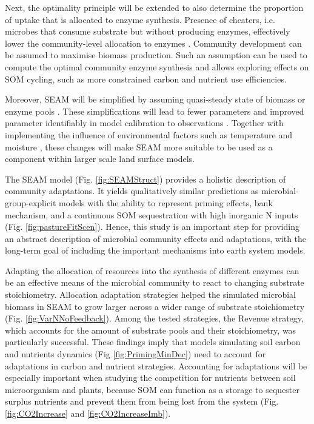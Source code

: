 Next, the optimality principle will be extended to also determine the proportion
of uptake that is allocated to enzyme synthesis. Presence of cheaters, i.e.
microbes that consume substrate but without producing enzymes, effectively lower
the community-level allocation to enzymes \citep{Kaiser14}. Community
development can be assumed to maximise biomass production. Such an assumption
can be used to compute the optimal community enzyme synthesis and allows
exploring effects on SOM cycling, such as more constrained carbon and nutrient
use efficiencies.

Moreover, SEAM will be simplified by assuming quasi-steady state of biomass or
enzyme pools \citep{Wutzler13}. These simplifications will lead to fewer
parameters and improved parameter identifiably in model calibration to
observations \citep{Xu14}.
Together with implementing the influence of environmental factors such as
temperature and moisture \citep{Davidson12}, these changes will make SEAM more
suitable to be used as a component within larger scale land surface models.
 
\conclusions
The SEAM model (Fig. \ref{fig:SEAMStruct}) provides a holistic description of
community adaptations. It yields qualitatively similar predictions as
microbial-group-explicit models with the ability to represent priming effects,
bank mechanism, and a continuous SOM sequestration with high inorganic N inputs
(Fig. \ref{fig:pastureFitScen}). Hence, this study is an important step
for providing an abstract description of microbial community effects and
adaptations, with the long-term goal of including the important mechanisms into
earth system models.

Adapting the allocation of resources into the synthesis of different enzymes can
be an effective means of the microbial community to react to changing substrate
stoichiometry. Allocation adaptation strategies helped the simulated microbial
biomass in SEAM to grow larger across a wider range of substrate stoichiometry
(Fig. \ref{fig:VarNNoFeedback}). Among the tested strategies, the Revenue
strategy, which accounts for the amount of substrate pools and their
stoichiometry, was particularly successful.
These findings imply that models simulating soil carbon and nutrients dynamics
(Fig \ref{fig:PrimingMinDec}) need to account for adaptations in carbon and
nutrient strategies. Accounting for adaptations will be especially important
when studying the competition for nutrients between soil microorganism and
plants, because SOM can function as a storage to sequester surplus nutrients and
prevent them from being lost from the system (Fig.
\ref{fig:CO2Increase} and \ref{fig:CO2IncreaseImb}).
